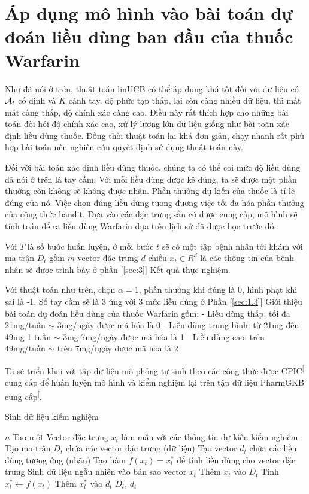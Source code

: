 \documentclass[14pt,oneside]{scrbook}
\begin{document}
\section{Áp dụng mô hình vào bài toán dự đoán liều dùng ban đầu của
thuốc
Warfarin}\label{uxe1p-dux1ee5ng-muxf4-huxecnh-vuxe0o-buxe0i-touxe1n-dux1ef1-ux111ouxe1n-liux1ec1u-duxf9ng-ban-ux111ux1ea7u-cux1ee7a-thuux1ed1c-warfarin}

Như đã nói ở trên, thuật toán linUCB có thể áp dụng khá tốt đối với dữ
liệu có \(\mathcal{A}_t\) cố định và \(K\) cánh tay, độ phức tạp thấp, lại còn
càng nhiều dữ liệu, thì mất mát càng thấp, độ chính xác càng cao. Điều
này rất thích hợp cho những bài toán đòi hỏi độ chính xác cao, xử lý
lượng lớn dữ liệu giống như bài toán xác định liều dùng thuốc. Đồng thời
thuật toán lại khá đơn giản, chạy nhanh rất phù hợp bài toán nên nghiên
cứu quyết định sử dụng thuật toán này.

Đối với bài toán xác định liều dùng thuốc, chúng ta có thể coi mức độ
liều dùng đã nói ở trên là tay cầm. Với mỗi liều dùng được kê đúng, ta
sẽ được một phần thưởng còn không sẽ không được nhận. Phần thưởng dự
kiến của thuốc là tỉ lệ đúng của nó. Việc chọn đúng liều dùng tương
đương việc tối đa hóa phần thưởng của công thức bandit. Dựa vào các đặc
trưng sẵn có được cung cấp, mô hình sẽ tính toán để ra liều dùng
Warfarin dựa trên lịch sử đã được học trước đó.

Với \(T\) là số bước huấn luyện, ở mỗi bước \(t\) sẽ có một tập bệnh
nhân tới khám với ma trận \(D_t\) gồm \(m\) vector đặc trưng \(d\) chiều
\(x_t \in R^d\) là các thông tin của bệnh nhân sẽ được trình bày ở phần
{[}\ref{sec:3}{]} Kết quả thực nghiệm.

Với thuật toán như trên, chọn \(\alpha = 1\), phần thưởng khi đúng là 0,
hình phạt khi sai là -1. Số tay cầm sẽ là 3 ứng với 3 mức liều dùng ở
Phần {[}\ref{sec:1.3}{]} Giới thiệu bài toán dự đoán liều dùng của thuốc
Warfarin gồm: - Liều dùng thấp: tối đa 21mg/tuần \(\sim\) 3mg/ngày được
mã hóa là 0 - Liều dùng trung bình: từ 21mg đến 49mg 1 tuần \(\sim\)
3mg-7mg/ngày được mã hóa là 1 - Liều dùng cao: trên 49mg/tuần \(\sim\)
trên 7mg/ngày được mã hóa là 2

Ta sẽ triển khai với tập dữ liệu mô phỏng tự sinh theo các công thức
được CPIC\textsuperscript{{[}\citeproc{ref-cpic}{2}{]}} cung cấp để huấn
luyện mô hình và kiểm nghiệm lại trên tập dữ liệu PharmGKB cung
cấp\textsuperscript{{[}\citeproc{ref-warfarin-data}{6}{]}}.

\begin{algorithm}[H]
\caption{Sinh dữ liệu kiểm nghiệm}
\begin{algorithmic}[1]
\Require $n$
\State Tạo một Vector đặc trưng $x_t$ làm mẫu với các thông tin dự kiến kiểm nghiệm
\State Tạo ma trận $D_t$ chứa các vector đặc trưng (dữ liệu)
\State Tạo vector $d_t$ chứa các liều dùng tương ứng (nhãn)
\State Tạo hàm $f(x_t)=x^*_t$ để tính liều dùng cho vector đặc trưng
    \State Sinh dữ liệu ngẫu nhiên vào bản sao vector $x_t$
    \State Thêm $x_t$ vào $D_t$
    \State Tính $x^*_t \leftarrow f(x_t)$
    \State Thêm $x^*_t$ vào $d_t$
\EndFor
\State \Return $D_t$, $d_t$
\end{algorithmic}
\end{algorithm}
\end{document}
